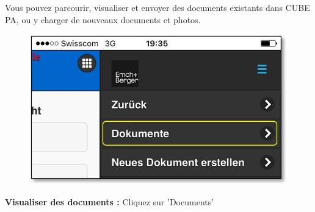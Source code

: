 Vous pouvez parcourir, visualiser et envoyer des documents existants dans CUBE PA, ou y charger de nouveaux documents et photos.

\vspace{\baselineskip}

\begin{figure}   %
  \vspace{-35pt}      %
  \begin{center}
    \includegraphics[width=1\linewidth]{../chapters/11_Dokumentenablage/pictures/11-mob02_Dokumente_anschauen.jpg}
  \end{center}
  \vspace{-20pt}
  \vspace{-10pt}
\end{figure}


\textbf{Visualiser des documents :} Cliquez sur 'Documents'

\pagebreak

